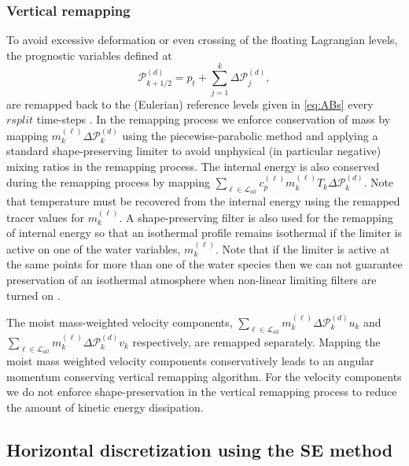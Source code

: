 \documentclass{agujournal}
\begin{document}
\subsubsection{Vertical remapping}\label{sec:verticalRemappin}
To avoid excessive deformation or even crossing of the floating Lagrangian levels, the prognostic variables defined at
\begin{equation}
\mathcal{P}^{(d)}_{k+1/2}=p_t+\sum_{j=1}^{k}\Delta \mathcal{P}^{(d)}_j,
\end{equation}
are remapped back to the (Eulerian) reference levels given in \eqref{eq:ABs} every $rsplit$ time-steps \citep{L2004MWR}. In the remapping process we enforce conservation of mass by mapping $m^{(\ell)}_k\Delta \mathcal{P}^{(d)}_k$ using the piecewise-parabolic method \cite[PPM; ][]{CW1984JCP} and applying a standard shape-preserving limiter to avoid unphysical (in particular negative) mixing ratios in the remapping process. The internal energy is also conserved during the remapping process by mapping $\sum_{\ell \in \mathcal{L}_{all}} c_p^{(\ell)} m_k^{(\ell)}T_k \Delta \mathcal{P}^{(d)}_k$. Note that temperature must be recovered from the internal energy using the remapped tracer values for $m^{(\ell)}_k$. A shape-preserving filter is also used for the remapping of internal energy so that an isothermal profile remains isothermal if the limiter is active on one of the water variables, $m^{(\ell)}_k$. Note that if the limiter is active at the same points for more than one of the water species then we can not guarantee preservation of an isothermal atmosphere when non-linear limiting filters are turned on \citep[see, e.g., Section 2.5 in ][]{LT2011QJR}.

The moist mass-weighted velocity components, $\sum_{\ell \in \mathcal{L}_{all}} m^{(\ell)}_k \Delta \mathcal{P}^{(d)}_k u_k$ and $\sum_{\ell \in \mathcal{L}_{all}} m_k^{(\ell)} \Delta \mathcal{P}^{(d)}_k v_k$ respectively, are remapped separately. Mapping the moist mass weighted velocity components conservatively leads to an angular momentum conserving vertical remapping algorithm. For the velocity components we do not enforce shape-preservation in the vertical remapping process to reduce the amount of kinetic energy dissipation.
\subsection{Horizontal discretization using the SE method}

\end{document}
